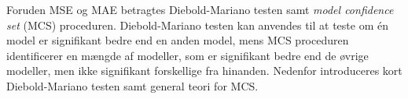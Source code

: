 Foruden MSE og MAE betragtes Diebold-Mariano testen samt \textit{model confidence set} (MCS) proceduren.
Diebold-Mariano testen kan anvendes til at teste om én model er signifikant bedre end en anden model, mens MCS proceduren identificerer en mængde af modeller, som er signifikant bedre end de øvrige modeller, men ikke signifikant forskellige fra hinanden.
Nedenfor introduceres kort Diebold-Mariano testen samt general teori for MCS.
%


%

%
%
